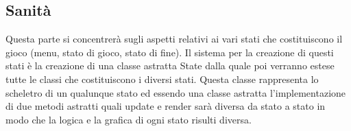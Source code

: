 \documentclass[a4paper,12pt]{report}
\begin{document}
    \subsection{Sanità}
    \par Questa parte si concentrerà sugli aspetti relativi ai vari stati che costituiscono il gioco (menu, stato di gioco, stato di fine).
    Il sistema per la creazione di questi stati è la creazione di una classe astratta State dalla quale poi verranno
    estese tutte le classi che costituiscono i diversi stati. Questa classe rappresenta lo scheletro di un qualunque
    stato ed essendo una classe astratta l’implementazione di due metodi astratti quali update e render sarà diversa da
    stato a stato in modo che la logica e la grafica di ogni stato risulti diversa.
    \\
    \\
    \par
    \\
\end{document}
